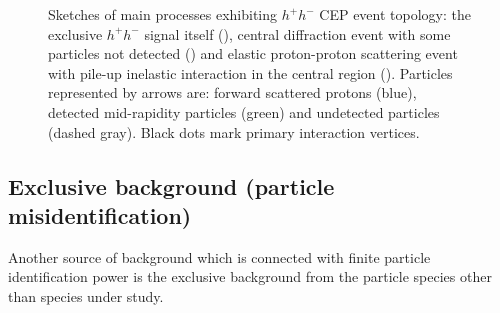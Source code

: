 \begin{figure}[h]
{  \begin{subfigure}[b]{0.9\linewidth}{
                }
  \end{subfigure} 
}%
\caption[Sketches of main processes with CEP event topology.]{Sketches of main processes exhibiting $h^{+}h^{-}$ CEP event topology: the exclusive $h^{+}h^{-}$ signal itself (), central diffraction event with some particles not detected () and elastic proton-proton scattering event with pile-up inelastic interaction in the central region (). Particles represented by arrows are: forward scattered protons (blue), detected mid-rapidity particles (green) and undetected particles (dashed gray). Black dots mark primary interaction vertices.}\label{fig:bkgdSources}
\end{figure}
 
 

\newpage
\subsection{Exclusive background (particle misidentification)}\label{sec:exclBkgd}

Another source of background which is connected with finite particle identification power is the exclusive background from the particle species other than species under study.


